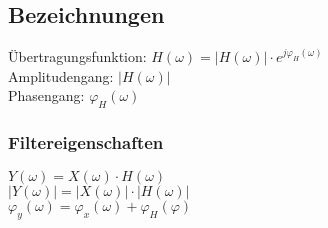 \begin{multicols}{2}
    \subsection{Bezeichnungen}
    Übertragungsfunktion: $H(\omega)=|H(\omega)| \cdot e^{j\varphi_H(\omega)}$ \\
    Amplitudengang: $|H(\omega)|$ \\
    Phasengang: $\varphi_H(\omega)$ \\

    \subsubsection{Filtereigenschaften}
    $Y(\omega) = X(\omega) \cdot H(\omega)$ \\
    $|Y(\omega)| = |X(\omega)| \cdot |H(\omega)|$ \\
    $\varphi_y(\omega) = \varphi_x(\omega) + \varphi_H(\varphi)$

\end{multicols}
